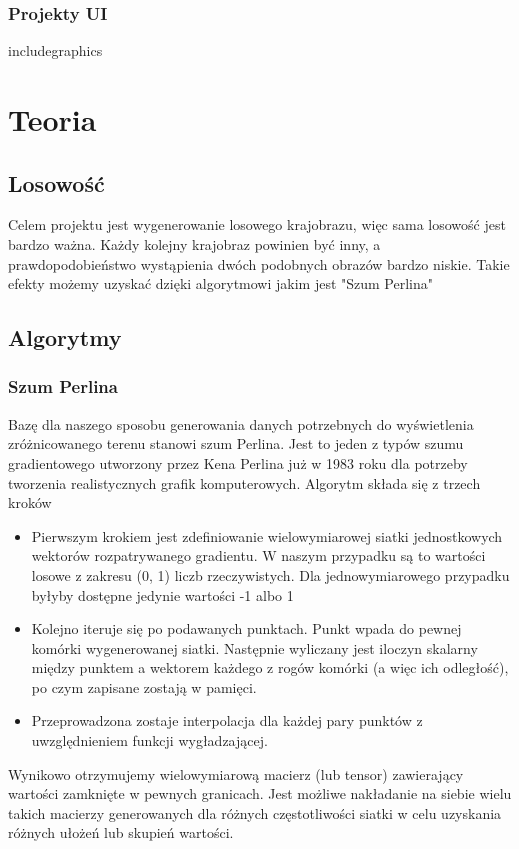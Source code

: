 \documentclass[12pt,a4paper]{article}
\begin{document}
\subsubsection{Projekty UI}
includegraphics
\section{Teoria}
\subsection{Losowość}
Celem projektu jest wygenerowanie losowego krajobrazu, więc sama losowość jest bardzo ważna. Każdy kolejny krajobraz powinien być inny, a prawdopodobieństwo wystąpienia dwóch podobnych obrazów bardzo niskie. Takie efekty możemy uzyskać dzięki algorytmowi jakim jest "Szum Perlina"
\subsection{Algorytmy}
\subsubsection{Szum Perlina}
Bazę dla naszego sposobu generowania danych potrzebnych do wyświetlenia zróżnicowanego terenu stanowi szum Perlina. Jest to jeden z typów szumu gradientowego utworzony przez Kena Perlina już w 1983 roku dla potrzeby tworzenia realistycznych grafik komputerowych. 
Algorytm składa się z trzech kroków
\begin{itemize}
\item Pierwszym krokiem jest zdefiniowanie wielowymiarowej siatki jednostkowych wektorów rozpatrywanego gradientu. W naszym przypadku są to wartości losowe z zakresu (0, 1) liczb rzeczywistych. Dla jednowymiarowego przypadku byłyby dostępne jedynie wartości -1 albo 1
\item Kolejno iteruje się po podawanych punktach. Punkt wpada do pewnej komórki wygenerowanej siatki. Następnie wyliczany jest iloczyn skalarny między punktem a wektorem każdego z rogów komórki (a więc ich odległość), po czym zapisane zostają w pamięci.
\item Przeprowadzona zostaje interpolacja dla każdej pary punktów z uwzględnieniem funkcji wygładzającej.
\end{itemize}
Wynikowo otrzymujemy wielowymiarową macierz (lub tensor) zawierający wartości zamknięte w pewnych granicach. Jest możliwe nakładanie na siebie wielu takich macierzy generowanych dla różnych częstotliwości siatki w celu uzyskania różnych ułożeń lub skupień wartości.
\end{document}
